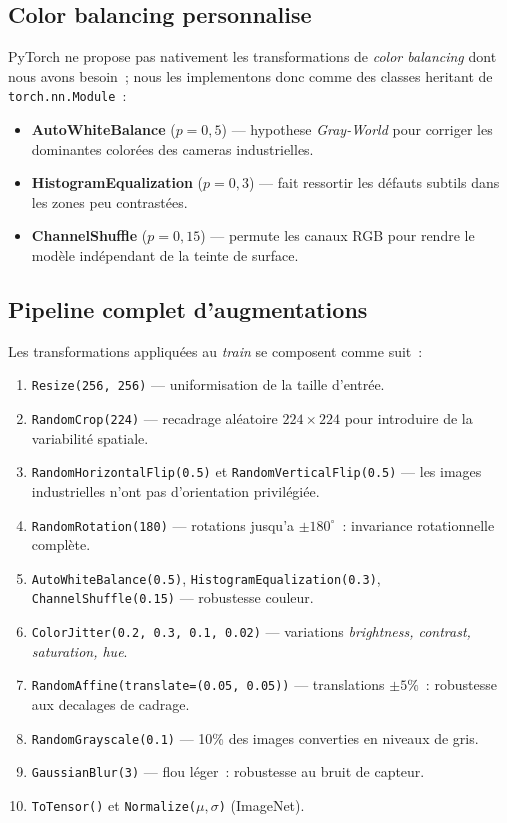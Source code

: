 \documentclass[12pt,a4paper,openany]{report}
\begin{document}
\subsection{Color balancing personnalise}

PyTorch ne propose pas nativement les transformations de \emph{color balancing} dont nous avons besoin~; nous les implementons donc comme des classes heritant de \texttt{torch.nn.Module}~:

\begin{itemize}
    \item \textbf{AutoWhiteBalance} ($p=0{,}5$) --- hypothese \emph{Gray-World} pour corriger les dominantes colorées des cameras industrielles.
    \item \textbf{HistogramEqualization} ($p=0{,}3$) --- fait ressortir les défauts subtils dans les zones peu contrastées.
    \item \textbf{ChannelShuffle} ($p=0{,}15$) --- permute les canaux RGB pour rendre le modèle indépendant de la teinte de surface.
\end{itemize}

\subsection{Pipeline complet d'augmentations}

Les transformations appliquées au \emph{train} se composent comme suit~:
\begin{enumerate}
    \item \texttt{Resize(256, 256)} --- uniformisation de la taille d'entrée.
    \item \texttt{RandomCrop(224)} --- recadrage aléatoire $224\times224$ pour introduire de la variabilité spatiale.
    \item \texttt{RandomHorizontalFlip(0.5)} et \texttt{RandomVerticalFlip(0.5)} --- les images industrielles n'ont pas d'orientation privilégiée.
    \item \texttt{RandomRotation(180)} --- rotations jusqu'a $\pm 180^\circ$~: invariance rotationnelle complète.
    \item \texttt{AutoWhiteBalance(0.5)}, \texttt{HistogramEqualization(0.3)}, \texttt{ChannelShuffle(0.15)} --- robustesse couleur.
    \item \texttt{ColorJitter(0.2, 0.3, 0.1, 0.02)} --- variations \emph{brightness, contrast, saturation, hue}.
    \item \texttt{RandomAffine(translate=(0.05, 0.05))} --- translations $\pm5\%$~: robustesse aux decalages de cadrage.
    \item \texttt{RandomGrayscale(0.1)} --- 10\% des images converties en niveaux de gris.
    \item \texttt{GaussianBlur(3)} --- flou léger~: robustesse au bruit de capteur.
    \item \texttt{ToTensor()} et \texttt{Normalize($\mu, \sigma$)} (ImageNet).
\end{enumerate}
\end{document}
